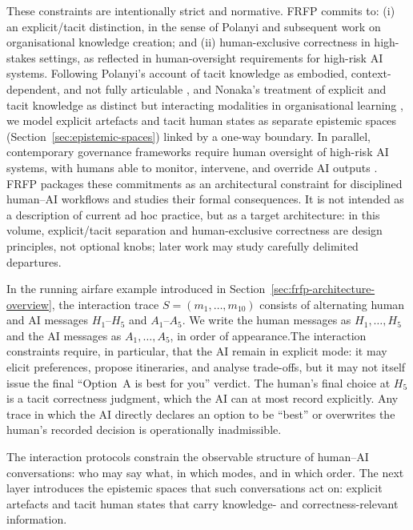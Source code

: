 These constraints are intentionally strict and normative. FRFP commits to: (i) an explicit/tacit distinction, in the sense of Polanyi and subsequent work on organisational knowledge creation; and (ii) human-exclusive correctness in high-stakes settings, as reflected in human-oversight requirements for high-risk AI systems. Following Polanyi's account of tacit knowledge as embodied, context-dependent, and not fully articulable \cite{Polanyi1966}, and Nonaka's treatment of explicit and tacit knowledge as distinct but interacting modalities in organisational learning \cite{Nonaka1994,NonakaTakeuchi1995}, we model explicit artefacts and tacit human states as separate epistemic spaces (Section~\ref{sec:epistemic-spaces}) linked by a one-way boundary. In parallel, contemporary governance frameworks require human oversight of high-risk AI systems, with humans able to monitor, intervene, and override AI outputs \cite{EUAIAct2024,Amershi2019}. FRFP packages these commitments as an architectural constraint for disciplined human--AI workflows and studies their formal consequences. It is not intended as a description of current ad hoc practice, but as a target architecture: in this volume, explicit/tacit separation and human-exclusive correctness are design principles, not optional knobs; later work may study carefully delimited departures.

In the running airfare example introduced in Section~\ref{sec:frfp-architecture-overview}, the interaction trace \(S = (m_1,\dots,m_{10})\) consists of alternating human and AI messages \(H_1\)--\(H_5\) and \(A_1\)--\(A_5\). We write the human messages as \(H_1,\dots,H_5\) and the AI messages as \(A_1,\dots,A_5\), in order of appearance.The interaction constraints require, in particular, that the AI remain in explicit mode: it may elicit preferences, propose itineraries, and analyse trade-offs, but it may not itself issue the final ``Option~A is best for you'' verdict. The human's final choice at \(H_5\) is a tacit correctness judgment, which the AI can at most record explicitly. Any trace in which the AI directly declares an option to be ``best'' or overwrites the human's recorded decision is operationally inadmissible.

The interaction protocols constrain the observable structure of human--AI conversations: who may say what, in which modes, and in which order. The next layer introduces the epistemic spaces that such conversations act on: explicit artefacts and tacit human states that carry knowledge- and correctness-relevant information.

